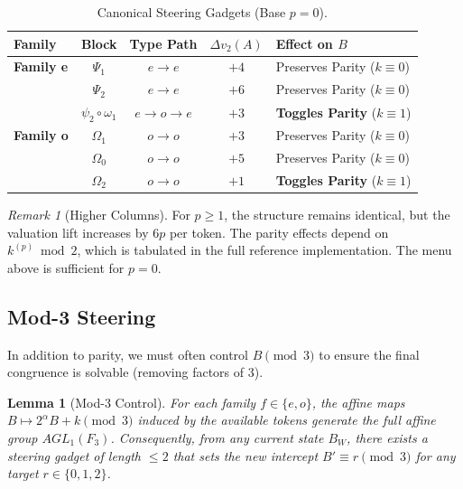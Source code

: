 \documentclass[11pt,letterpaper]{amsart}
\def\mathrm#1{#1}%
\def\mathbb#1{#1}%
\theoremstyle{definition}
\theoremstyle{plain}
\newtheorem{lemma}{Lemma}
\theoremstyle{plain}
\theoremstyle{remark}
\newtheorem*{remark}{Remark}
\begin{document}
\begin{table}[H]
\centering
\caption{Canonical Steering Gadgets (Base $p=0$).}
\label{tab:steering-menu}
\begin{tabular}{l c c c l}
\toprule
Family & Block & Type Path & $\Delta v_2(A)$ & Effect on $B$ \\ \midrule
\textbf{Family e} & $\Psi_1$ & $\mathrm{e} \to \mathrm{e}$ & $+4$ & Preserves Parity ($k \equiv 0$) \\
& $\Psi_2$ & $\mathrm{e} \to \mathrm{e}$ & $+6$ & Preserves Parity ($k \equiv 0$) \\
& $\psi_2 \circ \omega_1$ & $\mathrm{e} \to \mathrm{o} \to \mathrm{e}$ & $+3$ & \textbf{Toggles Parity} ($k \equiv 1$) \\ \midrule
\textbf{Family o} & $\Omega_1$ & $\mathrm{o} \to \mathrm{o}$ & $+3$ & Preserves Parity ($k \equiv 0$) \\
& $\Omega_0$ & $\mathrm{o} \to \mathrm{o}$ & $+5$ & Preserves Parity ($k \equiv 0$) \\
& $\Omega_2$ & $\mathrm{o} \to \mathrm{o}$ & $+1$ & \textbf{Toggles Parity} ($k \equiv 1$) \\
\bottomrule
\end{tabular}
\end{table}

\begin{remark}[Higher Columns]
For $p \ge 1$, the structure remains identical, but the valuation lift increases by $6p$ per token. The parity effects depend on $k^{(p)} \bmod 2$, which is tabulated in the full reference implementation. The menu above is sufficient for $p=0$.
\end{remark}

\subsection{Mod-3 Steering}
In addition to parity, we must often control $B \pmod 3$ to ensure the final congruence is solvable (removing factors of 3).

\begin{lemma}[Mod-3 Control]
\label{lem:mod3-steering}
For each family $f \in \{\mathrm{e}, \mathrm{o}\}$, the affine maps $B \mapsto 2^\alpha B + k \pmod 3$ induced by the available tokens generate the full affine group $\mathrm{AGL}_1(\mathbb{F}_3)$.
Consequently, from any current state $B_W$, there exists a steering gadget of length $\le 2$ that sets the new intercept $B' \equiv r \pmod 3$ for any target $r \in \{0, 1, 2\}$.
\end{lemma}
\end{document}

